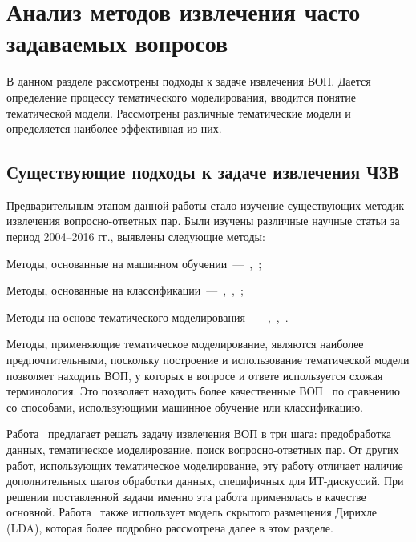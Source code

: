 \chapter{Анализ методов извлечения часто задаваемых вопросов}
\label{chap:overview}

В данном разделе рассмотрены подходы к задаче извлечения ВОП. Дается определение процессу тематического моделирования, вводится понятие тематической модели. Рассмотрены различные тематические модели и определяется наиболее эффективная из них.

\section{Существующие подходы к задаче извлечения ЧЗВ}
\label{sec:researches}

Предварительным этапом данной работы стало изучение существующих методик извлечения вопросно-ответных пар. Были изучены различные научные статьи за период 2004--2016 гг., выявлены следующие методы:

\begin{itemize*}
\item Методы, основанные на машинном обучении~---~\cite{ML1},~\cite{ML2};
\item Методы, основанные на классификации~---~\cite{classif1},~\cite{engine},~\cite{so};
\item Методы на основе тематического моделирования~---~\cite{LDA1},~\cite{LDA2},~\cite{original}.
\end{itemize*}

Методы, применяющие тематическое моделирование, являются наиболее предпочтительными, поскольку построение и использование тематической модели позволяет находить ВОП, у которых в вопросе и ответе используется схожая терминология. Это позволяет находить более качественные ВОП~\cite{LDA2} по сравнению со способами, использующими машинное обучение или классификацию.

Работа~\cite{original} предлагает решать задачу извлечения ВОП в три шага: предобработка данных, тематическое моделирование, поиск вопросно-ответных пар. От других работ, использующих тематическое моделирование, эту работу отличает наличие дополнительных шагов обработки данных, специфичных для ИТ-дискуссий. При решении поставленной задачи именно эта работа применялась в качестве основной. Работа~\cite{original} также использует модель скрытого размещения Дирихле (LDA), которая более подробно рассмотрена далее в этом разделе.

